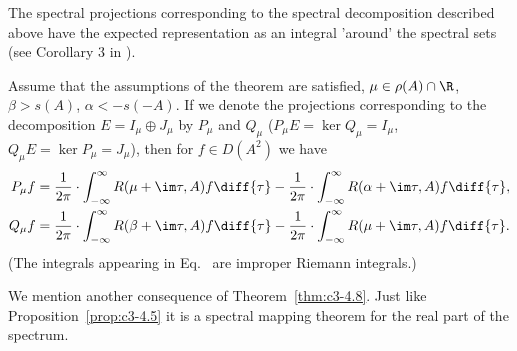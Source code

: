 The spectral projections corresponding to the spectral decomposition
described above have the expected representation as an integral
'around' the spectral sets (see Corollary 3 in \textcite{greiner:1984c}).

\begin{corollary}\label{cor:c3-4.9}
Assume that the assumptions of the theorem are satisfied, $\mu \in \rho(A) \cap \R $, $\beta > s(A)$, $\alpha < -s(-A)$. 
If we denote the projections corresponding to the decomposition $E = I_{\mu} \oplus J_{\mu}$ by $P_{\mu}$ and $Q_{\mu}$
(\ie  $P_{\mu}E = \ker Q_{\mu} = I_{\mu}$, $Q_{\mu}E = \ker P_{\mu} = J_{\mu}$), then for $f \in D(A^2)$ we
have
\begin{equation}\label{eq:c3-4.10}
\begin{split}
	P_{\mu}f &= \frac{1}{2\pi} \cdot \int_{-\infty}^{\infty} R(\mu+\im\tau,A)f \diff{\tau} - \frac{1}{2\pi} \cdot \int_{-\infty}^{\infty} R(\alpha+\im\tau,A)f \diff{\tau} ,\\
	Q_{\mu}f &= \frac{1}{2\pi} \cdot \int_{-\infty}^{\infty} R(\beta+\im\tau,A)f \diff{\tau} - \frac{1}{2\pi} \cdot \int_{-\infty}^{\infty} R(\mu+\im\tau,A)f \diff{\tau} .
\end{split}
\end{equation}
(The integrals appearing in Eq.~ are improper Riemann integrals.)
\end{corollary}
We mention another consequence of Theorem~\ref{thm:c3-4.8}. Just like Proposition~\ref{prop:c3-4.5} it is a
spectral mapping theorem for the real part of the spectrum.

